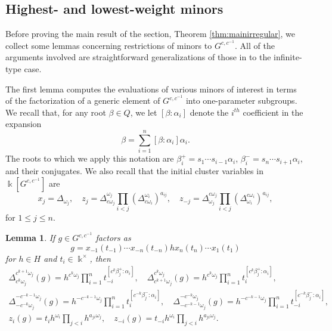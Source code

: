\documentclass[12pt]{amsart}
\newcommand{\kk}{\Bbbk}%
\newtheorem{lemma}[theorem]{Lemma}
\theoremstyle{remark}
\numberwithin{equation}{section}
\begin{document}
\subsection{Highest- and lowest-weight minors}

Before proving the main result of the section, Theorem \ref{thm:mainirregular}, we collect some lemmas concerning restrictions of minors to $G^{c,c^{-1}}$. All of the arguments involved are straightforward generalizations of those in \cite{YZ08} to the infinite-type case. 

The first lemma computes the evaluations of various minors of interest in terms of the factorization of a generic element of $G^{c,c^{-1}}$ into one-parameter subgroups. We recall that, for any root $\beta \in Q$, we let $[\beta:\alpha_i]$ denote the $i^{th}$ coefficient in the expansion
\[
\beta = \sum_{i = 1}^n [\beta:\alpha_i]\alpha_i.
\]
The roots to which we apply this notation are $\beta_i^+=s_1\cdots s_{i-1}\alpha_i$, $\beta_i^-=s_n\cdots s_{i+1}\alpha_i$, and their conjugates. We also recall that the initial cluster variables in $\kk[G^{c,c^{-1}}]$ are 
\[
x_j = \Delta_{\omega_j},\quad z_j = \Delta^{\omega_j}_{ c\omega_j} \prod_{i < j}(\Delta^{\omega_i}_{c \omega_i})^{a_{ij}},\quad z_{-j} = \Delta^{c \omega_j}_{\omega_j} \prod_{i < j}(\Delta^{c \omega_i}_{\omega_i})^{a_{ij}},
\]
for $1 \leq j \leq n$.

\begin{lemma}\label{lemma:coefficients_values}
If $g \in G^{c,c^{-1}}$ factors as
\begin{equation}\label{eq:generic_factorization}
g = x_{-1}(t_{-1}) \cdots x_{-n}(t_{-n}) h x_n(t_n) \cdots x_1(t_1)
\end{equation}
for $h \in H$ and $t_i \in \kk^\times$, then  
\begin{gather}
    \Delta^{c^{k+1}\omega_j}_{c^k\omega_j}(g) = h^{c^k\omega_j}\prod_{i=1}^n t_{-i}^{[c^k\beta_j^+:\alpha_i]},\quad 
    \Delta^{c^k\omega_j}_{c^{k+1}\omega_j}(g) = h^{c^k\omega_j}\prod_{i=1}^n t_{i}^{[c^k\beta_j^+:\alpha_i]},\label{eq:positive_cminor_values}\\
    \Delta^{-c^{-k-1}\omega_j}_{-c^{-k}\omega_j}(g) = h^{-c^{-k-1}\omega_j}\prod_{i=1}^n t_{i}^{[c^{-k}\beta_j^-:\alpha_i]}, \quad
    \Delta^{-c^{-k}\omega_j}_{-c^{-k-1}\omega_j}(g) = h^{-c^{-k-1}\omega_j}\prod_{i=1}^n t_{-i}^{[c^{-k}\beta_j^-:\alpha_i]},\label{eq:negative_cminor_values}\\
    z_i(g)
    =
    t_i
    h^{\omega_i}\prod_{ j <i}h^{a_{ j  i}\omega_ j },\quad 
    z_{-i}(g)
    =
    t_{-i}
    h^{\omega_i}\prod_{ j <i}h^{a_{ j  i}\omega_ j }.\label{eq:frozen_values}
\end{gather}
\end{lemma}
\end{document}
